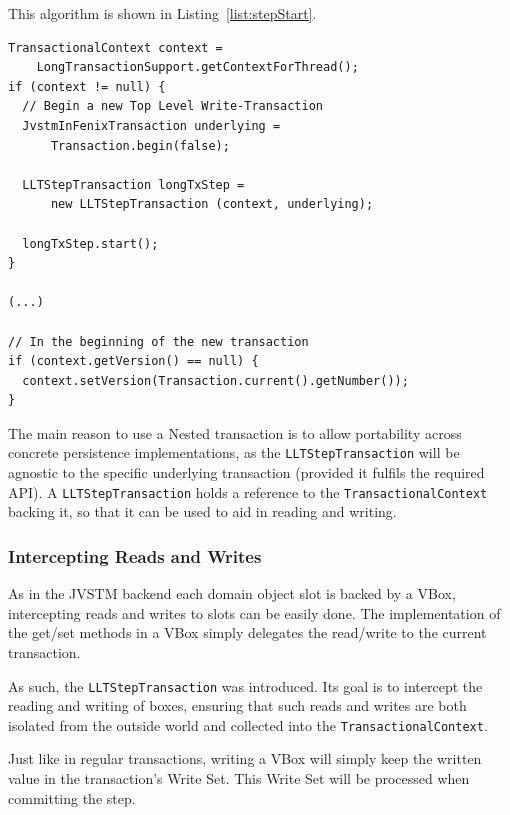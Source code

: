 \documentclass{llncs}
\begin{document}
This algorithm is shown in Listing~\ref{list:stepStart}.

\begin{lstlisting}[caption={Beginning a new Long Lived Transaction
    step}, label={list:stepStart}, float]
TransactionalContext context = 
    LongTransactionSupport.getContextForThread();
if (context != null) {
  // Begin a new Top Level Write-Transaction
  JvstmInFenixTransaction underlying =
      Transaction.begin(false);

  LLTStepTransaction longTxStep = 
      new LLTStepTransaction (context, underlying);

  longTxStep.start();
}

(...)

// In the beginning of the new transaction
if (context.getVersion() == null) {
  context.setVersion(Transaction.current().getNumber());
}
\end{lstlisting}

The main reason to use a Nested transaction is to allow portability
across concrete persistence implementations, as the
\texttt{LLTStepTransaction} will be agnostic to the specific
underlying transaction (provided it fulfils the required API). A
\texttt{LLTStepTransaction} holds a reference to the
\texttt{TransactionalContext} backing it, so that it can be used to
aid in reading and writing.

\subsubsection{Intercepting Reads and Writes}

As in the JVSTM backend each domain object slot is backed by a VBox,
intercepting reads and writes to slots can be easily done. The
implementation of the get/set methods in a VBox simply delegates the
read/write to the current transaction.

As such, the \texttt{LLTStepTransaction} was introduced. Its goal is
to intercept the reading and writing of boxes, ensuring that such
reads and writes are both isolated from the outside world and
collected into the \texttt{TransactionalContext}.

Just like in regular transactions, writing a VBox will simply keep the
written value in the transaction's Write Set. This Write Set will be
processed when committing the step. 
\end{document}

